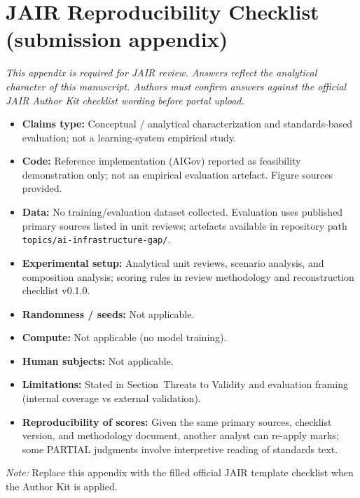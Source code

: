 \documentclass[11pt,a4paper]{article}
\begin{document}




\appendix
\section{JAIR Reproducibility Checklist (submission appendix)}
\label{app:repro}

\noindent\textit{This appendix is required for JAIR review. Answers reflect the analytical character of this manuscript. Authors must confirm answers against the official JAIR Author Kit checklist wording before portal upload.}

\begin{itemize}
\item \textbf{Claims type:} Conceptual / analytical characterization and standards-based evaluation; not a learning-system empirical study.
\item \textbf{Code:} Reference implementation (AIGov) reported as feasibility demonstration only; not an empirical evaluation artefact. Figure sources provided.
\item \textbf{Data:} No training/evaluation dataset collected. Evaluation uses published primary sources listed in unit reviews; artefacts available in repository path \texttt{topics/ai-infrastructure-gap/}.
\item \textbf{Experimental setup:} Analytical unit reviews, scenario analysis, and composition analysis; scoring rules in review methodology and reconstruction checklist v0.1.0.
\item \textbf{Randomness / seeds:} Not applicable.
\item \textbf{Compute:} Not applicable (no model training).
\item \textbf{Human subjects:} Not applicable.
\item \textbf{Limitations:} Stated in Section~Threats to Validity and evaluation framing (internal coverage vs external validation).
\item \textbf{Reproducibility of scores:} Given the same primary sources, checklist version, and methodology document, another analyst can re-apply marks; some PARTIAL judgments involve interpretive reading of standards text.
\end{itemize}

\textit{Note:} Replace this appendix with the filled official JAIR template checklist when the Author Kit is applied.
\end{document}
